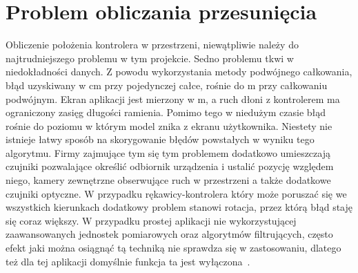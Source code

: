  
  \section{Problem obliczania przesunięcia}
 \label{sec:iuPrzesunięcie}
 Obliczenie położenia kontrolera w przestrzeni, niewątpliwie należy do najtrudniejszego problemu w tym projekcie. Sedno problemu tkwi w niedokładności danych. Z powodu wykorzystania metody podwójnego całkowania, błąd uzyskiwany w cm przy pojedynczej całce, rośnie do m przy całkowaniu podwójnym. Ekran aplikacji jest mierzony w m, a ruch dłoni z kontrolerem ma ograniczony zasięg długości ramienia. Pomimo tego w niedużym czasie błąd rośnie do poziomu w którym model znika z ekranu użytkownika. Niestety nie istnieje łatwy sposób na skorygowanie błędów powstałych w wyniku tego algorytmu. Firmy zajmujące tym się tym problemem dodatkowo umieszczają czujniki pozwalające określić odbiornik urządzenia i ustalić pozycję względem niego, kamery zewnętrzne obserwujące ruch w przestrzeni a także dodatkowe czujniki optyczne. W przypadku rękawicy-kontrolera który może poruszać się we wszystkich kierunkach dodatkowy problem stanowi rotacja, przez którą błąd staję się coraz większy. W przypadku prostej aplikacji nie wykorzystującej zaawansowanych jednostek pomiarowych oraz algorytmów filtrujących, często efekt jaki można osiągnąć tą techniką nie sprawdza się w zastosowaniu, dlatego też dla tej aplikacji domyślnie funkcja ta jest wyłączona~\cite{sensorslab}. 
 
 